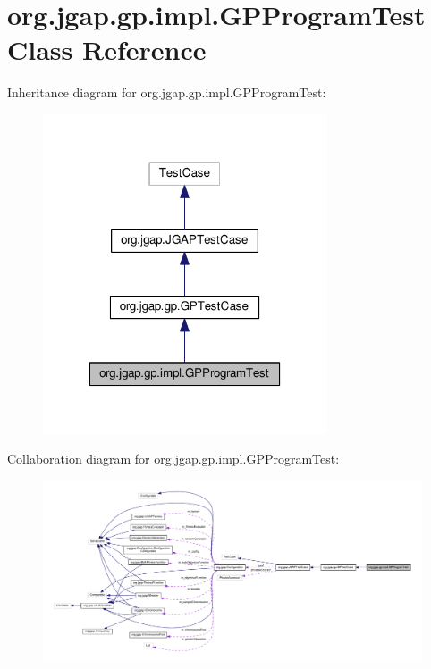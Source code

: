 \hypertarget{classorg_1_1jgap_1_1gp_1_1impl_1_1_g_p_program_test}{\section{org.\-jgap.\-gp.\-impl.\-G\-P\-Program\-Test Class Reference}
\label{classorg_1_1jgap_1_1gp_1_1impl_1_1_g_p_program_test}
}


Inheritance diagram for org.\-jgap.\-gp.\-impl.\-G\-P\-Program\-Test\-:
\nopagebreak
\begin{figure}[H]
\begin{center}
\leavevmode
\includegraphics[width=238pt]{classorg_1_1jgap_1_1gp_1_1impl_1_1_g_p_program_test__inherit__graph}
\end{center}
\end{figure}


Collaboration diagram for org.\-jgap.\-gp.\-impl.\-G\-P\-Program\-Test\-:
\nopagebreak
\begin{figure}[H]
\begin{center}
\leavevmode
\includegraphics[width=350pt]{classorg_1_1jgap_1_1gp_1_1impl_1_1_g_p_program_test__coll__graph}
\end{center}
\end{figure}
